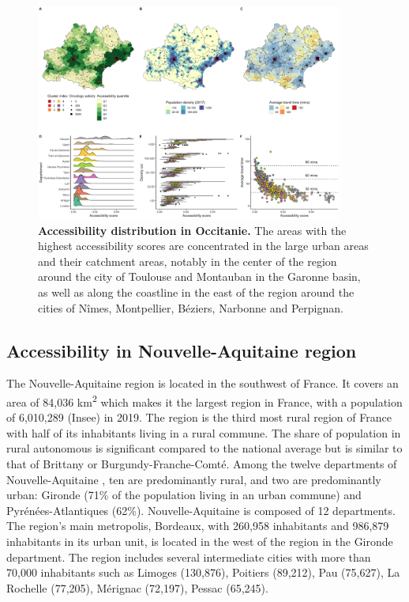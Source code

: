 \begin{figure}[H]
    \includegraphics[width=0.9\textwidth]{images/camion/region_accessibility/accessibility_Occitanie.png}
    \centering
    \caption{
        \textbf{Accessibility distribution in Occitanie.} The areas with the highest accessibility scores are concentrated in
        the large urban areas and their catchment areas, notably in the center of the
        region around the city of Toulouse and Montauban in the Garonne basin, as well
        as along the coastline in the east of the region around the cities of Nîmes,
        Montpellier, Béziers, Narbonne and Perpignan.
    }
\end{figure}

\subsection*{Accessibility in Nouvelle-Aquitaine region}

The Nouvelle-Aquitaine region is located in the southwest of France. It covers
an area of 84,036 km\textsuperscript{2} which makes it the largest region in
France, with a population of 6,010,289 (Insee) in 2019. The region is the third
most rural region of France with half of its inhabitants living in a rural
commune. The share of population in rural autonomous is significant compared to
the national average but is similar to that of Brittany or
Burgundy-Franche-Comté. Among the twelve departments of Nouvelle-Aquitaine , ten
are predominantly rural, and two are predominantly urban: Gironde (71\% of the
population living in an urban commune) and Pyrénées-Atlantiques (62\%).
Nouvelle-Aquitaine is composed of 12 departments. The region's main metropolis,
Bordeaux, with 260,958 inhabitants and 986,879 inhabitants in its urban unit, is
located in the west of the region in the Gironde department. The region includes
several intermediate cities with more than 70,000 inhabitants such as Limoges
(130,876), Poitiers (89,212), Pau (75,627), La Rochelle (77,205), Mérignac
(72,197), Pessac (65,245).

